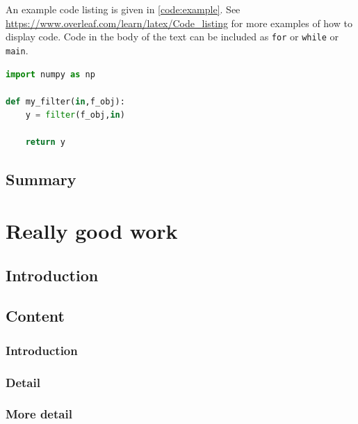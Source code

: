     An example code listing is given in \autoref{code:example}. See \url{https://www.overleaf.com/learn/latex/Code_listing} for more examples of how to display code. Code in the body of the text can be included as \lstinline{for} or \lstinline{while} or \lstinline{main}.

    \begin{lstlisting}[language=Python, caption={My code example}, label={code:example}]
import numpy as np
    
def my_filter(in,f_obj):
    y = filter(f_obj,in)
    
    return y
    \end{lstlisting}
  
  \section{Summary}
    \lipsum[6] %
  
  
  
\chapter{Really good work} \label{sec:really_good_work}

  \section{Introduction}
    \lipsum[1] %
  
  \section{Content} \label{sec:content}
    \subsection{Introduction}
	\lipsum[1] %
	
	\subsection{Detail}
        \lipsum[7-11] %
    
	\subsection{More detail}
	\lipsum[1-3] %
	
